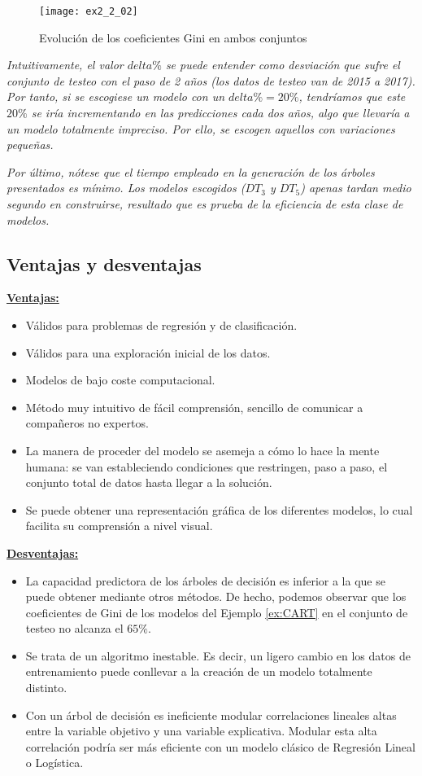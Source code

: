 \documentclass[12pt,twoside]{article}
\begin{document}
\begin{figure}[h]
\centering
\texttt{[image: ex2\_2\_02]}
\caption{Evolución de los coeficientes Gini en ambos conjuntos}
\label{fig:exCART}
\end{figure}

\newpage
\emph{Intuitivamente, el valor $delta\%$ se puede entender como desviación que sufre el conjunto de testeo con el paso de 2 años (los datos de testeo van de 2015 a 2017). Por tanto, si se escogiese un modelo con un $delta\% = 20\%$, tendríamos que este $20\%$ se iría incrementando en las predicciones cada dos años, algo que llevaría a un modelo totalmente impreciso. Por ello, se escogen aquellos con variaciones pequeñas.}

\emph{Por último, nótese que el tiempo empleado en la generación de los árboles presentados es mínimo. Los modelos escogidos ($DT_3$ y $DT_5$) apenas tardan medio segundo en construirse, resultado que es prueba de la eficiencia de esta clase de modelos.}





\subsection{Ventajas y desventajas}
\textbf{\underline{Ventajas:}}
\begin{itemize}
\item Válidos para problemas de regresión y de clasificación.
\item Válidos para una exploración inicial de los datos.
\item Modelos de bajo coste computacional.
\item Método muy intuitivo de fácil comprensión, sencillo de comunicar a compañeros no expertos.
\item La manera de proceder del modelo se asemeja a cómo lo hace la mente humana: se van estableciendo condiciones que restringen, paso a paso, el conjunto total de datos hasta llegar a la solución.
\item Se puede obtener una representación gráfica de los diferentes modelos, lo cual facilita su comprensión a nivel visual.
\end{itemize}

\textbf{\underline{Desventajas:}}
\begin{itemize}
\item La capacidad predictora de los árboles de decisión es inferior a la que se puede obtener mediante otros métodos. De hecho, podemos observar que los coeficientes de Gini de los modelos del Ejemplo \ref{ex:CART} en el conjunto de testeo no alcanza el $65\%$.
\item Se trata de un algoritmo inestable. Es decir, un ligero cambio en los datos de entrenamiento puede conllevar a la creación de un modelo totalmente distinto. %
\item Con un árbol de decisión es ineficiente modular correlaciones lineales altas entre la variable objetivo y una variable explicativa. Modular esta alta correlación podría ser más eficiente con un modelo clásico de Regresión Lineal o Logística.
\end{itemize}
\end{document}
